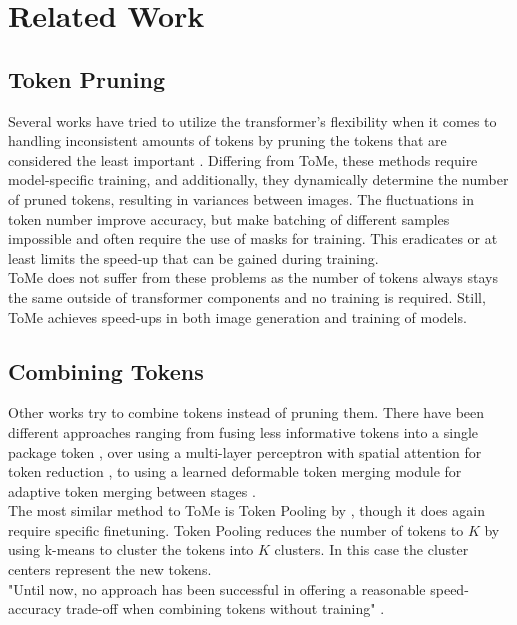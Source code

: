 \section{Related Work} \label{related_work}


\subsection{Token Pruning}
Several works have tried to utilize the transformer's flexibility when it comes to handling inconsistent amounts of tokens by pruning the tokens that are considered the least important \cite{meng2022adavit,yin2022vit}. 
Differing from ToMe, these methods require model-specific training, and additionally, they dynamically determine the number of pruned tokens, resulting in variances between images. The fluctuations in token number improve accuracy, but make batching of different samples impossible and often require the use of masks for training. This eradicates or at least limits the speed-up that can be gained during training.\\
ToMe does not suffer from these problems as the number of tokens always stays the same outside of transformer components and no training is required. Still, ToMe achieves speed-ups in both image generation and training of models.



\subsection{Combining Tokens}
Other works try to combine tokens instead of pruning them.
There have been different approaches ranging from fusing less informative tokens into a single package token \cite{kong2021spvit, liang2022not}, over using a multi-layer perceptron with spatial attention for token reduction \cite{ryoo2021tokenlearner}, to using a learned deformable token merging module for adaptive token merging between stages \cite{pan2022less}.\\
The most similar method to ToMe is Token Pooling by \cite{marin2021token}, though it does again require specific finetuning. Token Pooling reduces the number of tokens to \(K\) by using k-means to cluster the tokens into \(K\) clusters. In this case the cluster centers represent the new tokens.\\
"Until now, no approach has been successful in offering a reasonable speed-accuracy trade-off when combining tokens without training" \cite{bolya2023tome}.



